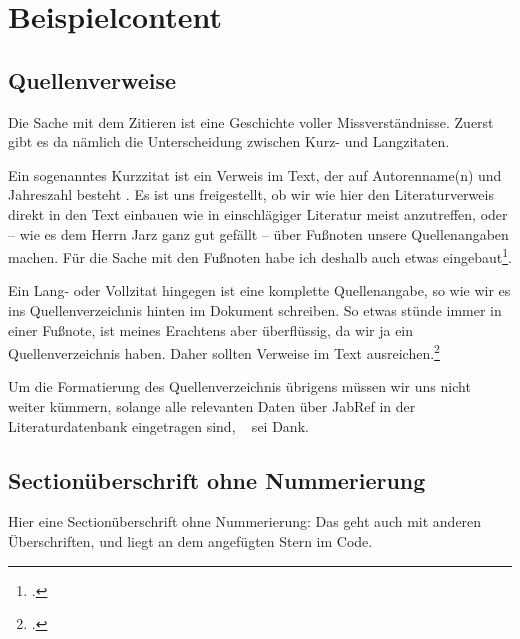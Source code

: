 


\chapter{Beispielcontent}


\section{Quellenverweise}

Die Sache mit dem Zitieren ist eine Geschichte voller Missverständnisse. Zuerst gibt es da nämlich die Unterscheidung zwischen Kurz- und Langzitaten.

Ein sogenanntes Kurzzitat ist ein Verweis im Text, der auf Autorenname(n) und Jahreszahl besteht \cite[vgl.][S.72]{Jarz2008}. Es ist uns freigestellt, ob wir wie hier den Literaturverweis direkt in den Text einbauen wie in einschlägiger Literatur meist anzutreffen, oder -- wie es dem Herrn Jarz ganz gut gefällt -- über Fußnoten unsere Quellenangaben machen. Für die Sache mit den Fußnoten habe ich deshalb auch etwas eingebaut\footcite[S.39]{Jarz2008}. 

Ein Lang- oder Vollzitat hingegen ist eine komplette Quellenangabe, so wie wir es ins Quellenverzeichnis hinten im Dokument schreiben. So etwas stünde immer in einer Fußnote, ist meines Erachtens aber überflüssig, da wir ja ein Quellenverzeichnis haben. Daher sollten Verweise im Text ausreichen.\footcite{paula}

Um die Formatierung des Quellenverzeichnis übrigens müssen wir uns nicht weiter kümmern, solange alle relevanten Daten über JabRef in der Literaturdatenbank eingetragen sind, \BibTeX~ sei Dank.







\section*{Sectionüberschrift ohne Nummerierung}
Hier eine Sectionüberschrift ohne Nummerierung: Das geht auch mit anderen Überschriften, und liegt an dem angefügten Stern im Code.



